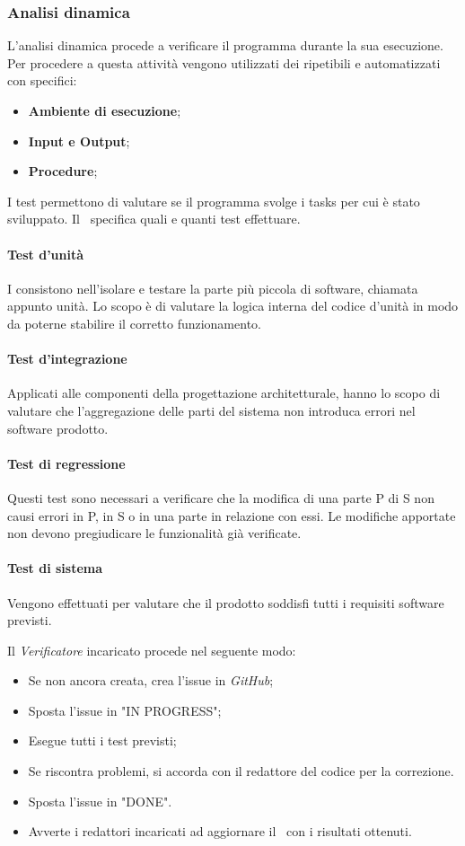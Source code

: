 \subsubsection{Analisi dinamica}
L'analisi dinamica procede a verificare il programma durante la sua esecuzione. Per procedere a questa attività vengono utilizzati dei  ripetibili e automatizzati con specifici:
\begin{itemize}
	\item \textbf{Ambiente di esecuzione};
	\item \textbf{Input e Output};
	\item \textbf{Procedure};
\end{itemize}

\label{Tests}
I test permettono di valutare se il programma svolge i tasks per cui è stato sviluppato. Il \PdQv{}\ specifica quali e quanti test effettuare.
\paragraph*{Test d'unità}
I  consistono nell'isolare e testare la parte più piccola di software, chiamata appunto unità. Lo scopo è di valutare la logica interna del codice d'unità in modo da poterne stabilire il corretto funzionamento. 
\paragraph*{Test d'integrazione}
Applicati alle componenti della progettazione architetturale, hanno lo scopo di valutare che l'aggregazione delle parti del sistema non introduca errori nel software prodotto.
\paragraph*{Test di regressione}
Questi test sono necessari a verificare che la modifica di una parte P di S non causi errori in P, in S o in una parte in relazione con essi. Le modifiche apportate non devono pregiudicare le funzionalità già verificate. 
\paragraph*{Test di sistema}
Vengono effettuati per valutare che il prodotto soddisfi tutti i requisiti software previsti.

\label{ProceduraVerifica}Il \textit{Verificatore} incaricato procede nel seguente modo:
\begin{itemize}
	\item Se non ancora creata, crea l'issue in \textit{GitHub};
	\item Sposta l'issue in "IN PROGRESS";
	\item Esegue tutti i test previsti;
	\item Se riscontra problemi, si accorda con il redattore del codice per la correzione. 
	\item Sposta l'issue in "DONE".
	\item Avverte i redattori incaricati ad aggiornare il \PdQv\ con i risultati ottenuti.
\end{itemize}